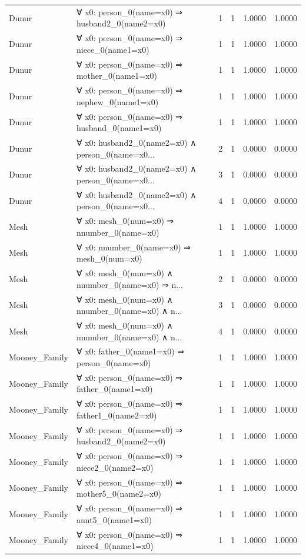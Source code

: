 \documentclass[11pt,a4paper]{article}
\begin{document}
\begin{table}[h!]
\begin{longtable}{|l|p{6cm}|c|c|c|c|}
Dunur & ∀ x0: person\_0(name=x0) ⇒ husband2\_0(name2=x0) & 1 & 1 & 1.0000 & 1.0000 \\
Dunur & ∀ x0: person\_0(name=x0) ⇒ niece\_0(name1=x0) & 1 & 1 & 1.0000 & 1.0000 \\
Dunur & ∀ x0: person\_0(name=x0) ⇒ mother\_0(name1=x0) & 1 & 1 & 1.0000 & 1.0000 \\
Dunur & ∀ x0: person\_0(name=x0) ⇒ nephew\_0(name1=x0) & 1 & 1 & 1.0000 & 1.0000 \\
Dunur & ∀ x0: person\_0(name=x0) ⇒ husband\_0(name1=x0) & 1 & 1 & 1.0000 & 1.0000 \\
Dunur & ∀ x0: husband2\_0(name2=x0) ∧ person\_0(name=x0... & 2 & 1 & 0.0000 & 0.0000 \\
Dunur & ∀ x0: husband2\_0(name2=x0) ∧ person\_0(name=x0... & 3 & 1 & 0.0000 & 0.0000 \\
Dunur & ∀ x0: husband2\_0(name2=x0) ∧ person\_0(name=x0... & 4 & 1 & 0.0000 & 0.0000 \\
Mesh & ∀ x0: mesh\_0(num=x0) ⇒ nnumber\_0(name=x0) & 1 & 1 & 1.0000 & 1.0000 \\
Mesh & ∀ x0: nnumber\_0(name=x0) ⇒ mesh\_0(num=x0) & 1 & 1 & 1.0000 & 1.0000 \\
Mesh & ∀ x0: mesh\_0(num=x0) ∧ nnumber\_0(name=x0) ⇒ n... & 2 & 1 & 0.0000 & 0.0000 \\
Mesh & ∀ x0: mesh\_0(num=x0) ∧ nnumber\_0(name=x0) ∧ n... & 3 & 1 & 0.0000 & 0.0000 \\
Mesh & ∀ x0: mesh\_0(num=x0) ∧ nnumber\_0(name=x0) ∧ n... & 4 & 1 & 0.0000 & 0.0000 \\
Mooney_Family & ∀ x0: father\_0(name1=x0) ⇒ person\_0(name=x0) & 1 & 1 & 1.0000 & 1.0000 \\
Mooney_Family & ∀ x0: person\_0(name=x0) ⇒ father\_0(name1=x0) & 1 & 1 & 1.0000 & 1.0000 \\
Mooney_Family & ∀ x0: person\_0(name=x0) ⇒ father1\_0(name2=x0) & 1 & 1 & 1.0000 & 1.0000 \\
Mooney_Family & ∀ x0: person\_0(name=x0) ⇒ husband2\_0(name2=x0) & 1 & 1 & 1.0000 & 1.0000 \\
Mooney_Family & ∀ x0: person\_0(name=x0) ⇒ niece2\_0(name2=x0) & 1 & 1 & 1.0000 & 1.0000 \\
Mooney_Family & ∀ x0: person\_0(name=x0) ⇒ mother5\_0(name2=x0) & 1 & 1 & 1.0000 & 1.0000 \\
Mooney_Family & ∀ x0: person\_0(name=x0) ⇒ aunt5\_0(name1=x0) & 1 & 1 & 1.0000 & 1.0000 \\
Mooney_Family & ∀ x0: person\_0(name=x0) ⇒ niece4\_0(name1=x0) & 1 & 1 & 1.0000 & 1.0000 \\

\end{longtable}
\end{table}
\end{document}
